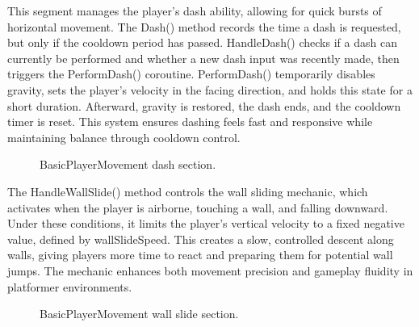 \documentclass[12pt,oneside,openright,a4paper]{cpe-english-project}
\begin{document}
\newpage
This segment manages the player's dash ability, allowing for quick bursts of horizontal movement. The Dash() method records the time a dash is requested, but only if the cooldown period has passed. HandleDash() checks if a dash can currently be performed and whether a new dash input was recently made, then triggers the PerformDash() coroutine. PerformDash() temporarily disables gravity, sets the player's velocity in the facing direction, and holds this state for a short duration. Afterward, gravity is restored, the dash ends, and the cooldown timer is reset. This system ensures dashing feels fast and responsive while maintaining balance through cooldown control.\par
 \begin{figure}[!h]
 \centering
\caption{BasicPlayerMovement dash section.}\label{fig:dash}
\end{figure}
The HandleWallSlide() method controls the wall sliding mechanic, which activates when the player is airborne, touching a wall, and falling downward. Under these conditions, it limits the player’s vertical velocity to a fixed negative value, defined by wallSlideSpeed. This creates a slow, controlled descent along walls, giving players more time to react and preparing them for potential wall jumps. The mechanic enhances both movement precision and gameplay fluidity in platformer environments.\par
 \begin{figure}[!h]
 \centering
\caption{BasicPlayerMovement wall slide section.}\label{fig:wall}
\end{figure}
\end{document}
